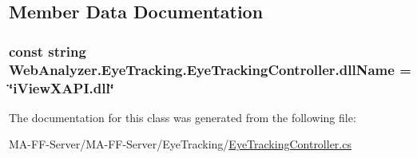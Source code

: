\subsection{Member Data Documentation}
\hypertarget{class_web_analyzer_1_1_eye_tracking_1_1_eye_tracking_controller_a3d379c5e2e4fe3eb39090973223e79a8}{}
\subsubsection[{dll\+Name}]{\setlength{\rightskip}{0pt plus 5cm}const string Web\+Analyzer.\+Eye\+Tracking.\+Eye\+Tracking\+Controller.\+dll\+Name = \char`\"{}i\+View\+X\+A\+P\+I.\+dll\char`\"{}\hspace{0.3cm}{\ttfamily [private]}}\label{class_web_analyzer_1_1_eye_tracking_1_1_eye_tracking_controller_a3d379c5e2e4fe3eb39090973223e79a8}


The documentation for this class was generated from the following file\+:\begin{DoxyCompactItemize}
\item 
M\+A-\/\+F\+F-\/\+Server/\+M\+A-\/\+F\+F-\/\+Server/\+Eye\+Tracking/\hyperlink{_eye_tracking_controller_8cs}{Eye\+Tracking\+Controller.\+cs}\end{DoxyCompactItemize}
